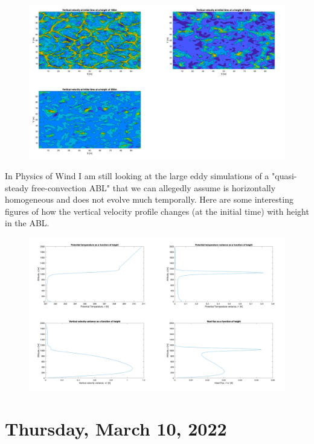 \documentclass[12pt]{report}
\begin{document}
\begin{figure}[H]
\centering
\includegraphics[width=\linewidth]{images/vertical_velocity_contour.pdf}
\end{figure}

\par
In Physics of Wind I am still looking at the large eddy simulations of a "quasi-steady free-convection ABL" that we can allegedly assume is horizontally homogeneous and does not evolve much temporally. Here are some interesting figures of how the vertical velocity profile changes (at the initial time) with height in the ABL.

\begin{figure}[H]
\centering
\includegraphics[width=\linewidth]{images/ABL_Vertical_Profiles.pdf}
\end{figure}


\section{Thursday, March 10, 2022}
\end{document}
